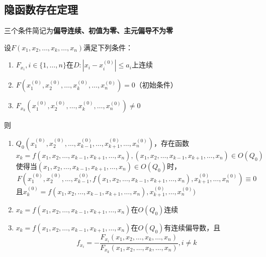 \subsection{隐函数存在定理}
三个条件简记为\textbf{偏导连续、初值为零、主元偏导不为零}
\begin{theorem}
设$F(x_1,x_2,\ldots,x_k,\ldots,x_n)$满足下列条件：
\begin{enumerate}
	\itemsep-3pt
	\item $F_{x_i},i\in\{1,\ldots,n\}$在$D:|x_i-x_i^{(0)}|\leq a_i$上连续
	\item $F(x_1^{(0)},x_2^{(0)},\ldots,x_k^{(0)},\ldots,x_n^{(0)})=0$（初始条件）
	\item $F_{x_k}(x_1^{(0)},x_2^{(0)},\ldots,x_k^{(0)},\ldots,x_n^{(0)})\ne0$
\end{enumerate}
则
\begin{enumerate}
	\itemsep -3pt
	\item $Q_0(x_1^{(0)},x_2^{(0)},\ldots,x_{k-1}^{(0)},\ldots,x_{k+1}^{(0)},\ldots,x_n^{(0)})$，存在函数\[x_k=f(x_1,x_2,\ldots,x_{k-1},x_{k+1},\ldots,x_n),(x_1,x_2,\ldots,x_{k-1},x_{k+1},\ldots,x_n)\in O(Q_0)\]
	使得当$(x_1,x_2,\ldots,x_{k-1},x_{k+1},\ldots,x_n)\in O(Q_0)$时，
	\[F(x_1^{(0)},x_2^{(0)},\ldots,x_{k-1}^{(0)},f(x_1,x_2,\ldots,x_{k-1},x_{k+1},\ldots,x_n),x_{k+1}^{(0)},\ldots,x_n^{(0)})\equiv 0\]
	且$x_{k}^{(0)}=f(x_1,x_2,\ldots,x_{k-1},x_{k+1},\ldots,x_n),x_{k+1}^{(0)},\ldots,x_n^{(0)})$
	\item $x_k=f(x_1,x_2,\ldots,x_{k-1},x_{k+1},\ldots,x_n)$在$O(Q_0)$连续
	\item $x_k=f(x_1,x_2,\ldots,x_{k-1},x_{k+1},\ldots,x_n)$在$O(Q_0)$有连续偏导数，且
	\[f_{x_i}=-\frac{F_{x_i}(x_1,x_2,\ldots,x_k,\ldots,x_n)}{F_{x_k}(x_1,x_2,\ldots,x_k,\ldots,x_n)},i\ne k\]
\end{enumerate}
\end{theorem}
